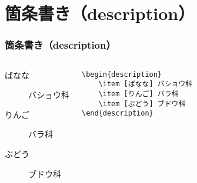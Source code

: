 \documentclass[t,aspectratio=169]{beamer}
\begin{document}
\section{箇条書き（description）}
\begin{frame}[fragile]
    \frametitle{箇条書き（description）}
    \begin{columns}
        \begin{description}
            \item [ばなな] バショウ科
            \item [りんご] バラ科
            \item [ぶどう] ブドウ科
        \end{description}
        \begin{verbatim}
\begin{description}
    \item [ばなな] バショウ科
    \item [りんご] バラ科
    \item [ぶどう] ブドウ科
\end{description}
        \end{verbatim}
    \end{columns}
\end{frame}
\end{document}
